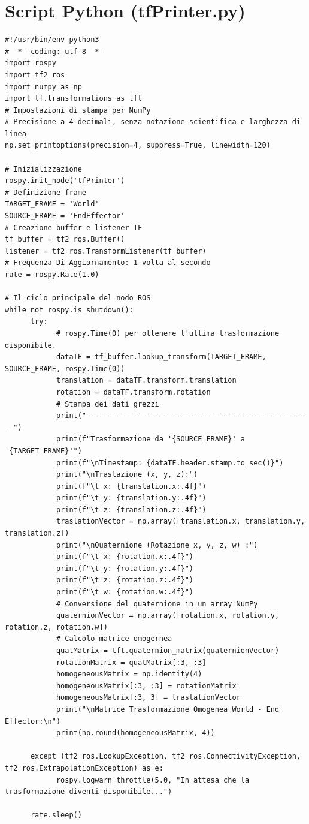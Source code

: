 \documentclass[11pt, a4paper]{report}
\begin{document}
\section{Script Python (tfPrinter.py)}
\label{sec:script_python}
\begin{lstlisting}[style=pythonStyle]
#!/usr/bin/env python3
# -*- coding: utf-8 -*-
import rospy
import tf2_ros
import numpy as np
import tf.transformations as tft
# Impostazioni di stampa per NumPy
# Precisione a 4 decimali, senza notazione scientifica e larghezza di linea
np.set_printoptions(precision=4, suppress=True, linewidth=120)

# Inizializzazione
rospy.init_node('tfPrinter')
# Definizione frame
TARGET_FRAME = 'World'
SOURCE_FRAME = 'EndEffector'
# Creazione buffer e listener TF
tf_buffer = tf2_ros.Buffer()
listener = tf2_ros.TransformListener(tf_buffer)
# Frequenza Di Aggiornamento: 1 volta al secondo
rate = rospy.Rate(1.0)

# Il ciclo principale del nodo ROS
while not rospy.is_shutdown():
      try:
            # rospy.Time(0) per ottenere l'ultima trasformazione disponibile.
            dataTF = tf_buffer.lookup_transform(TARGET_FRAME, SOURCE_FRAME, rospy.Time(0))
            translation = dataTF.transform.translation
            rotation = dataTF.transform.rotation
            # Stampa dei dati grezzi
            print("-----------------------------------------------------")
            print(f"Trasformazione da '{SOURCE_FRAME}' a '{TARGET_FRAME}'")
            print(f"\nTimestamp: {dataTF.header.stamp.to_sec()}")
            print("\nTraslazione (x, y, z):")
            print(f"\t x: {translation.x:.4f}")
            print(f"\t y: {translation.y:.4f}")
            print(f"\t z: {translation.z:.4f}")
            traslationVector = np.array([translation.x, translation.y, translation.z])
            print("\nQuaternione (Rotazione x, y, z, w) :")
            print(f"\t x: {rotation.x:.4f}")
            print(f"\t y: {rotation.y:.4f}")
            print(f"\t z: {rotation.z:.4f}")
            print(f"\t w: {rotation.w:.4f}")
            # Conversione del quaternione in un array NumPy
            quaternionVector = np.array([rotation.x, rotation.y, rotation.z, rotation.w])
            # Calcolo matrice omogernea
            quatMatrix = tft.quaternion_matrix(quaternionVector)
            rotationMatrix = quatMatrix[:3, :3]
            homogeneousMatrix = np.identity(4)
            homogeneousMatrix[:3, :3] = rotationMatrix
            homogeneousMatrix[:3, 3] = traslationVector
            print("\nMatrice Trasformazione Omogenea World - End Effector:\n")
            print(np.round(homogeneousMatrix, 4))

      except (tf2_ros.LookupException, tf2_ros.ConnectivityException, tf2_ros.ExtrapolationException) as e:
            rospy.logwarn_throttle(5.0, "In attesa che la trasformazione diventi disponibile...")

      rate.sleep()
\end{lstlisting}
\end{document}
